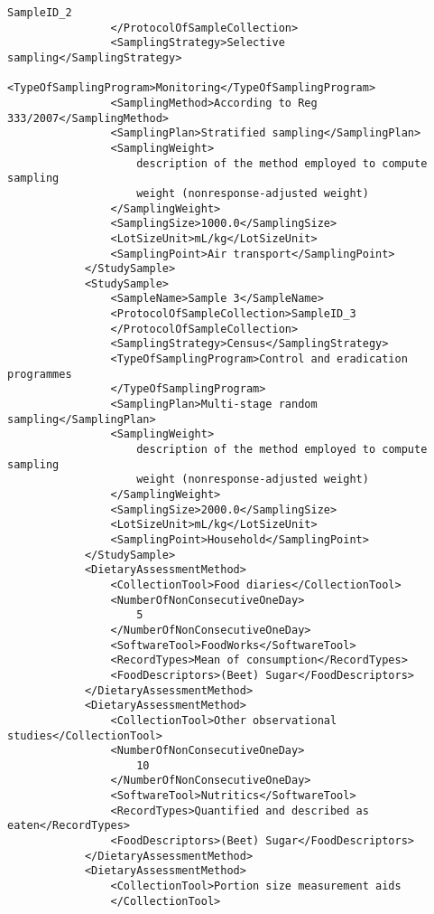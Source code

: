 \begin{lstlisting}[language=RAKIP, caption={Example of GenericModel}]
                    SampleID_2
                </ProtocolOfSampleCollection>
                <SamplingStrategy>Selective sampling</SamplingStrategy>
                <TypeOfSamplingProgram>Monitoring</TypeOfSamplingProgram>
                <SamplingMethod>According to Reg 333/2007</SamplingMethod>
                <SamplingPlan>Stratified sampling</SamplingPlan>
                <SamplingWeight>
                    description of the method employed to compute sampling
                    weight (nonresponse-adjusted weight)
                </SamplingWeight>
                <SamplingSize>1000.0</SamplingSize>
                <LotSizeUnit>mL/kg</LotSizeUnit>
                <SamplingPoint>Air transport</SamplingPoint>
            </StudySample>
            <StudySample>
                <SampleName>Sample 3</SampleName>
                <ProtocolOfSampleCollection>SampleID_3
                </ProtocolOfSampleCollection>
                <SamplingStrategy>Census</SamplingStrategy>
                <TypeOfSamplingProgram>Control and eradication programmes
                </TypeOfSamplingProgram>
                <SamplingPlan>Multi-stage random sampling</SamplingPlan>
                <SamplingWeight>
                    description of the method employed to compute sampling
                    weight (nonresponse-adjusted weight)
                </SamplingWeight>
                <SamplingSize>2000.0</SamplingSize>
                <LotSizeUnit>mL/kg</LotSizeUnit>
                <SamplingPoint>Household</SamplingPoint>
            </StudySample>
            <DietaryAssessmentMethod>
                <CollectionTool>Food diaries</CollectionTool>
                <NumberOfNonConsecutiveOneDay>
                    5
                </NumberOfNonConsecutiveOneDay>
                <SoftwareTool>FoodWorks</SoftwareTool>
                <RecordTypes>Mean of consumption</RecordTypes>
                <FoodDescriptors>(Beet) Sugar</FoodDescriptors>
            </DietaryAssessmentMethod>
            <DietaryAssessmentMethod>
                <CollectionTool>Other observational studies</CollectionTool>
                <NumberOfNonConsecutiveOneDay>
                    10
                </NumberOfNonConsecutiveOneDay>
                <SoftwareTool>Nutritics</SoftwareTool>
                <RecordTypes>Quantified and described as eaten</RecordTypes>
                <FoodDescriptors>(Beet) Sugar</FoodDescriptors>
            </DietaryAssessmentMethod>
            <DietaryAssessmentMethod>
                <CollectionTool>Portion size measurement aids
                </CollectionTool>

\end{lstlisting}
